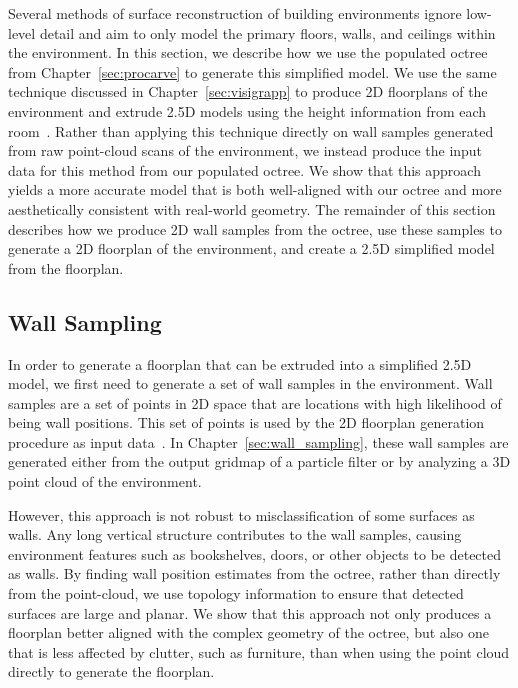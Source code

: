\documentclass[12pt,onecolumn,oneside]{book}
\begin{document}
Several methods of surface reconstruction of building environments ignore low-level detail and aim to only model the primary floors, walls, and ceilings within the environment.  In this section, we describe how we use the populated octree from Chapter~\ref{sec:procarve} to generate this simplified model.  We use the same technique discussed in Chapter~\ref{sec:visigrapp} to produce 2D floorplans of the environment and extrude 2.5D models using the height information from each room~\cite{Turner14}.  Rather than applying this technique directly on wall samples generated from raw point-cloud scans of the environment, we instead produce the input data for this method from our populated octree.  We show that this approach yields a more accurate model that is both well-aligned with our octree and more aesthetically consistent with real-world geometry.  The remainder of this section describes how we produce 2D wall samples from the octree, use these samples to generate a 2D floorplan of the environment, and create a 2.5D simplified model from the floorplan.

\subsection{Wall Sampling}
\label{ssec:oct2dq}

In order to generate a floorplan that can be extruded into a simplified 2.5D model, we first need to generate a set of wall samples in the environment.  Wall samples are a set of points in 2D space that are locations with high likelihood of being wall positions.  This set of points is used by the 2D floorplan generation procedure as input data~\cite{Turner14}.  In Chapter~\ref{sec:wall_sampling}, these wall samples are generated either from the output gridmap of a particle filter or by analyzing a 3D point cloud of the environment.

However, this approach is not robust to misclassification of some surfaces as walls.  Any long vertical structure contributes to the wall samples, causing environment features such as bookshelves, doors, or other objects to be detected as walls.  By finding wall position estimates from the octree, rather than directly from the point-cloud, we use topology information to ensure that detected surfaces are large and planar.  We show that this approach not only produces a floorplan better aligned with the complex geometry of the octree, but also one that is less affected by clutter, such as furniture, than when using the point cloud directly to generate the floorplan.
\end{document}

